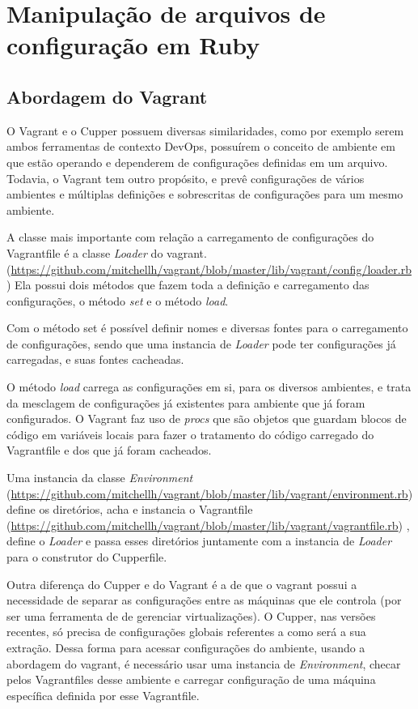 \chapter[Configuração Ruby]{Manipulação de arquivos de configuração em Ruby}
\label{apc:conf-file}

\section{Abordagem do Vagrant}
O Vagrant e o Cupper possuem diversas similaridades, como por exemplo serem ambos
ferramentas de contexto DevOps, possuírem o conceito de ambiente em que estão operando
e dependerem de configurações definidas em um arquivo. Todavia, o Vagrant tem
outro propósito, e prevê configurações de vários ambientes e múltiplas definições e sobrescritas
de configurações para um mesmo ambiente.

A classe mais importante com relação a carregamento de configurações do Vagrantfile
é a classe \textit{Loader} do vagrant.
(\url{https://github.com/mitchellh/vagrant/blob/master/lib/vagrant/config/loader.rb})
Ela possui dois métodos que fazem toda a definição e carregamento das configurações, 
o método \textit{set} e o método \textit{load}. 

Com o método set é possível definir nomes e diversas fontes para o 
carregamento de configurações, sendo que uma instancia de \textit{Loader} 
pode ter configurações já carregadas, e suas fontes cacheadas.

O método \textit{load} carrega as configurações em si, para os diversos ambientes,
e trata da mesclagem de configurações já existentes para ambiente que já foram
configurados. O Vagrant faz uso de \textit{procs} que são objetos que guardam
blocos de código em variáveis locais para fazer o tratamento do código carregado
do Vagrantfile e dos que já foram cacheados.

Uma instancia da classe \textit{Environment} 
(\url{https://github.com/mitchellh/vagrant/blob/master/lib/vagrant/environment.rb})
define os diretórios, acha e instancia o Vagrantfile
(\url{https://github.com/mitchellh/vagrant/blob/master/lib/vagrant/vagrantfile.rb})
, define o \textit{Loader} e passa esses diretórios juntamente com a instancia de \textit{Loader} para o construtor do Cupperfile.

Outra diferença do Cupper e do Vagrant é a de que o vagrant possui a necessidade
de separar as configurações entre as máquinas que ele controla (por ser uma
ferramenta de de gerenciar virtualizações). O Cupper, nas versões recentes, só precisa de
configurações globais referentes a como será a sua extração. Dessa forma para
acessar configurações do ambiente, usando a abordagem do vagrant, é necessário
usar uma instancia de \textit{Environment}, checar pelos Vagrantfiles desse ambiente
e carregar configuração de uma máquina específica definida por esse Vagrantfile.

